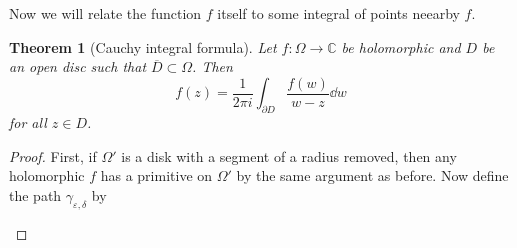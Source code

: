 \documentclass[leqno, openany]{memoir}
\newtheorem{thm}{Theorem}[section]
\theoremstyle{definition}
\theoremstyle{remark}
\theoremstyle{plain}
\theoremstyle{definition}
\theoremstyle{remark}
\newcommand{\C}{\mathbb{C}}
\newcommand{\ep}{\varepsilon}
\newcommand{\ol}[1]{\overline{#1}}
\begin{document}
Now we will relate the function $f$ itself to some integral of points neearby $f$.

\begin{thm}[Cauchy integral formula]
    Let $f \colon \Omega \to \C$ be holomorphic and $D$ be an open disc such that $\ol{D} \subset \Omega$. Then
    \[ f(z) = \frac{1}{2 \pi i} \int_{\partial D} \frac{f(w)}{w-z} \dd{w} \]
    for all $z \in D$.
\end{thm}

\begin{proof}
    First, if $\Omega'$ is a disk with a segment of a radius removed, then any holomorphic $f$ has a primitive on $\Omega'$ by the same argument as before. Now define the path $\gamma_{\ep, \delta}$ by
    \begin{figure}[H]
    \begin{center}
\end{center}
\end{figure}
\end{proof}
\end{document}
